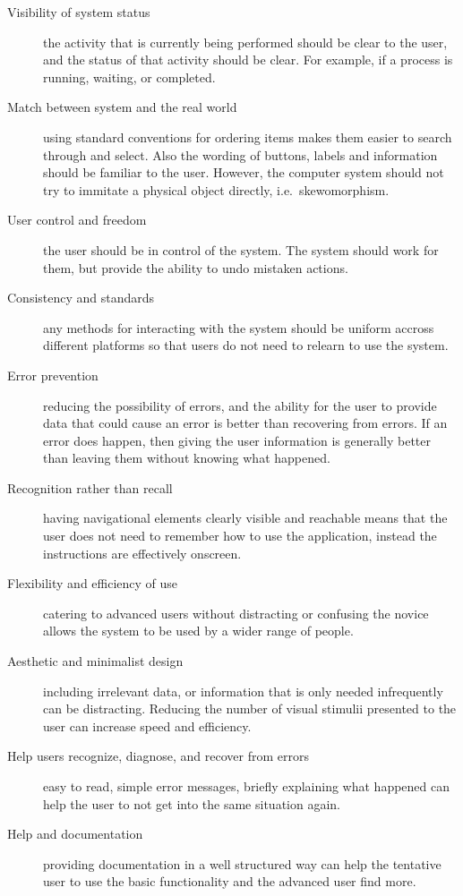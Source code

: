 \begin{description}

	\item[Visibility of system status] the activity that is currently being
		performed should be clear to the user, and the status of that activity
		should be clear. For example, if a process is running, waiting, or
		completed.

	\item[Match between system and the real world] using standard conventions
		for ordering items makes them easier to search through and select. Also
		the wording of buttons, labels and information should be familiar to
		the user. However, the computer system should not try to immitate a
		physical object directly, i.e.\ skewomorphism.

	\item[User control and freedom] the user should be in control of the
		system. The system should work for them, but provide the ability to
		undo mistaken actions.

	\item[Consistency and standards] any methods for interacting with the
		system should be uniform accross different platforms so that users do
		not need to relearn to use the system.

	\item[Error prevention] reducing the possibility of errors, and the ability
		for the user to provide data that could cause an error is better than
		recovering from errors. If an error does happen, then giving the user
		information is generally better than leaving them without knowing what
		happened.

	\item[Recognition rather than recall] having navigational elements clearly
		visible and reachable means that the user does not need to remember how
		to use the application, instead the instructions are effectively
		onscreen.

	\item[Flexibility and efficiency of use] catering to advanced users without
		distracting or confusing the novice allows the system to be used by a
		wider range of people.

	\item[Aesthetic and minimalist design] including irrelevant data, or
		information that is only needed infrequently can be distracting.
		Reducing the number of visual stimulii presented to the user can
		increase speed and efficiency.

	\item[Help users recognize, diagnose, and recover from errors] easy to
		read, simple error messages, briefly explaining what happened can help
		the user to not get into the same situation again.

	\item[Help and documentation] providing documentation in a well structured
		way can help the tentative user to use the basic functionality and the
		advanced user find more.

\end{description}
